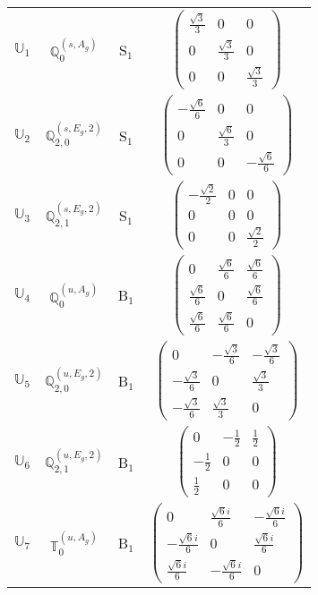 \documentclass[fleqn,10pt,landscape]{article}
\begin{document}
\begin{itemize}
\begin{center}
\begin{longtable}{c|c|c|c}
$ \mathbb{U}_{1} $ & $\mathbb{Q}_{0}^{(s,A_{g})}$ & S$_{1}$ & $\begin{pmatrix} \frac{\sqrt{3}}{3} & 0 & 0 \\ 0 & \frac{\sqrt{3}}{3} & 0 \\ 0 & 0 & \frac{\sqrt{3}}{3} \end{pmatrix}$ \\
$ \mathbb{U}_{2} $ & $\mathbb{Q}_{2,0}^{(s,E_{g},2)}$ & S$_{1}$ & $\begin{pmatrix} - \frac{\sqrt{6}}{6} & 0 & 0 \\ 0 & \frac{\sqrt{6}}{3} & 0 \\ 0 & 0 & - \frac{\sqrt{6}}{6} \end{pmatrix}$ \\
$ \mathbb{U}_{3} $ & $\mathbb{Q}_{2,1}^{(s,E_{g},2)}$ & S$_{1}$ & $\begin{pmatrix} - \frac{\sqrt{2}}{2} & 0 & 0 \\ 0 & 0 & 0 \\ 0 & 0 & \frac{\sqrt{2}}{2} \end{pmatrix}$ \\ \hline
$ \mathbb{U}_{4} $ & $\mathbb{Q}_{0}^{(u,A_{g})}$ & B$_{1}$ & $\begin{pmatrix} 0 & \frac{\sqrt{6}}{6} & \frac{\sqrt{6}}{6} \\ \frac{\sqrt{6}}{6} & 0 & \frac{\sqrt{6}}{6} \\ \frac{\sqrt{6}}{6} & \frac{\sqrt{6}}{6} & 0 \end{pmatrix}$ \\
$ \mathbb{U}_{5} $ & $\mathbb{Q}_{2,0}^{(u,E_{g},2)}$ & B$_{1}$ & $\begin{pmatrix} 0 & - \frac{\sqrt{3}}{6} & - \frac{\sqrt{3}}{6} \\ - \frac{\sqrt{3}}{6} & 0 & \frac{\sqrt{3}}{3} \\ - \frac{\sqrt{3}}{6} & \frac{\sqrt{3}}{3} & 0 \end{pmatrix}$ \\
$ \mathbb{U}_{6} $ & $\mathbb{Q}_{2,1}^{(u,E_{g},2)}$ & B$_{1}$ & $\begin{pmatrix} 0 & - \frac{1}{2} & \frac{1}{2} \\ - \frac{1}{2} & 0 & 0 \\ \frac{1}{2} & 0 & 0 \end{pmatrix}$ \\
$ \mathbb{U}_{7} $ & $\mathbb{T}_{0}^{(u,A_{g})}$ & B$_{1}$ & $\begin{pmatrix} 0 & \frac{\sqrt{6} i}{6} & - \frac{\sqrt{6} i}{6} \\ - \frac{\sqrt{6} i}{6} & 0 & \frac{\sqrt{6} i}{6} \\ \frac{\sqrt{6} i}{6} & - \frac{\sqrt{6} i}{6} & 0 \end{pmatrix}$ \\

\end{longtable}
\end{center}
\end{itemize}
\end{document}
